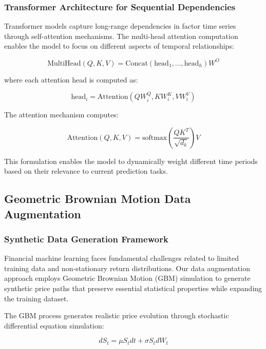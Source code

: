 \documentclass[conference]{IEEEtran}
\begin{document}
\subsubsection{Transformer Architecture for Sequential Dependencies}

Transformer models capture long-range dependencies in factor time series through self-attention mechanisms. The multi-head attention computation enables the model to focus on different aspects of temporal relationships:

\begin{equation}
\text{MultiHead}(Q, K, V) = \text{Concat}(\text{head}_1, ..., \text{head}_h)W^O
\end{equation}

where each attention head is computed as:

\begin{equation}
\text{head}_i = \text{Attention}(QW_i^Q, KW_i^K, VW_i^V)
\end{equation}

The attention mechanism computes:

\begin{equation}
\text{Attention}(Q, K, V) = \text{softmax}\left(\frac{QK^T}{\sqrt{d_k}}\right)V
\end{equation}

This formulation enables the model to dynamically weight different time periods based on their relevance to current prediction tasks.

\subsection{Geometric Brownian Motion Data Augmentation}

\subsubsection{Synthetic Data Generation Framework}

Financial machine learning faces fundamental challenges related to limited training data and non-stationary return distributions. Our data augmentation approach employs Geometric Brownian Motion (GBM) simulation to generate synthetic price paths that preserve essential statistical properties while expanding the training dataset.

The GBM process generates realistic price evolution through stochastic differential equation simulation:

\begin{equation}
dS_t = \mu S_t dt + \sigma S_t dW_t
\end{equation}
\end{document}
